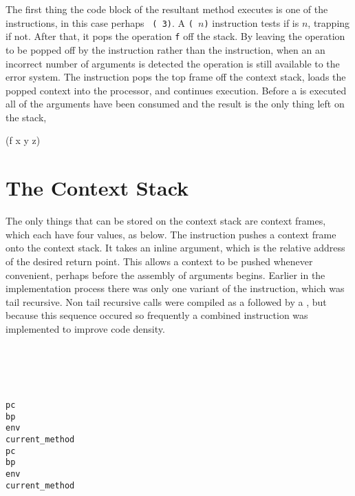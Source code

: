 The first thing the code block of the resultant method executes is one
of the  instructions, in this case perhaps {\tt
( 3)}.  A {\tt ( $n$)} instruction
tests if  is $n$, trapping if not.  After that, it pops the
operation {\tt f} off the stack.  By leaving the operation to be
popped off by the  instruction rather than the
 instruction, when an an incorrect number of arguments is
detected the operation is still available to the error system.  The
 instruction pops the top frame off the context stack,
loads the popped context into the processor, and continues execution.
Before a
 is executed all of the arguments have been consumed and
the result is the only thing left on the stack,
\begin{stackphoto}
 (f x y z) \\\hline
\end{stackphoto}

\section{The Context Stack}

The only things that can be stored on the context stack are context
frames, which each have four values, as below.  The 
instruction pushes a context frame onto the context stack.  It takes
an inline argument, which is the relative address of the desired
return point.  This allows a context to be pushed whenever convenient,
perhaps before the assembly of arguments begins.  Earlier in the
implementation process there was only one variant of the 
instruction, which was tail recursive.  Non tail recursive calls were
compiled as a  followed by a , but
because this sequence occured so frequently a combined instruction was
implemented to improve code density.

\begin{stackphoto}\hline
  \tt {}  \\ \hline
  \tt {}  \\ \hline
  \tt {} \\\hline
  \tt {} \\\hline\hline
  \tt pc  \\ \hline
  \tt bp  \\ \hline
  \tt env \\\hline
  \tt current\_method \\\hline\hline
  \tt pc  \\ \hline
  \tt bp  \\ \hline
  \tt env \\\hline
  \tt current\_method \\\hline
\end{stackphoto}

